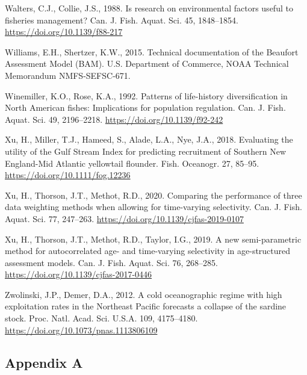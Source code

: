 \documentclass[]{article}
\begin{document}
\leavevmode\hypertarget{ref-walters1988Research}{}%
Walters, C.J., Collie, J.S., 1988. Is research on environmental factors
useful to fisheries management? Can. J. Fish. Aquat. Sci. 45,
1848--1854. \url{https://doi.org/10.1139/f88-217}

\leavevmode\hypertarget{ref-williams2015Technical}{}%
Williams, E.H., Shertzer, K.W., 2015. Technical documentation of the
Beaufort Assessment Model (BAM). U.S. Department of Commerce, NOAA
Technical Memorandum NMFS-SEFSC-671.

\leavevmode\hypertarget{ref-winemiller1992Patterns}{}%
Winemiller, K.O., Rose, K.A., 1992. Patterns of life-history
diversification in North American fishes: Implications for population
regulation. Can. J. Fish. Aquat. Sci. 49, 2196--2218.
\url{https://doi.org/10.1139/f92-242}

\leavevmode\hypertarget{ref-xu2018Evaluating}{}%
Xu, H., Miller, T.J., Hameed, S., Alade, L.A., Nye, J.A., 2018.
Evaluating the utility of the Gulf Stream Index for predicting
recruitment of Southern New England-Mid Atlantic yellowtail flounder.
Fish. Oceanogr. 27, 85--95. \url{https://doi.org/10.1111/fog.12236}

\leavevmode\hypertarget{ref-xu2020Comparing}{}%
Xu, H., Thorson, J.T., Methot, R.D., 2020. Comparing the performance of
three data weighting methods when allowing for time-varying selectivity.
Can. J. Fish. Aquat. Sci. 77, 247--263.
\url{https://doi.org/10.1139/cjfas-2019-0107}

\leavevmode\hypertarget{ref-xu2019New}{}%
Xu, H., Thorson, J.T., Methot, R.D., Taylor, I.G., 2019. A new
semi-parametric method for autocorrelated age- and time-varying
selectivity in age-structured assessment models. Can. J. Fish. Aquat.
Sci. 76, 268--285. \url{https://doi.org/10.1139/cjfas-2017-0446}

\leavevmode\hypertarget{ref-zwolinski2012Cold}{}%
Zwolinski, J.P., Demer, D.A., 2012. A cold oceanographic regime with
high exploitation rates in the Northeast Pacific forecasts a collapse of
the sardine stock. Proc. Natl. Acad. Sci. U.S.A. 109, 4175--4180.
\url{https://doi.org/10.1073/pnas.1113806109}

\pagebreak

\hypertarget{appendix-a}{%
\subsection*{Appendix A}\label{appendix-a}}
\end{document}
